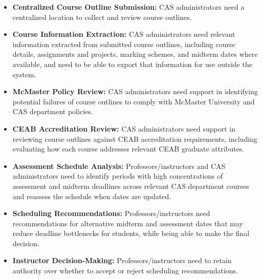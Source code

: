 \documentclass[12pt]{article}
\newcounter{srnum} %
\begin{document}

\noindent \begin{itemize}
  
\item[SR\refstepcounter{srnum}\thesrnum \label{SR-CAS-01}:] \textbf{Centralized Course Outline Submission:} 
CAS administrators need a centralized location to collect and review course outlines.

\item[SR\refstepcounter{srnum}\thesrnum \label{SR-CAS-02}:] \textbf{Course Information Extraction:} 
CAS administrators need relevant information extracted from submitted course outlines, including course 
details, assignments and projects, marking schemes, and midterm dates where available, and need to be able 
to export that information for use outside the system.

\item[SR\refstepcounter{srnum}\thesrnum \label{SR-CAS-03}:] \textbf{McMaster Policy Review:} 
CAS administrators need support in identifying potential failures of course outlines to comply 
with McMaster University and CAS department policies.

\item[SR\refstepcounter{srnum}\thesrnum \label{SR-CAS-04}:] \textbf{CEAB Accreditation Review:} 
CAS administrators need support in reviewing course outlines against CEAB accreditation 
requirements, including evaluating how each course addresses relevant CEAB graduate attributes.

\item[SR\refstepcounter{srnum}\thesrnum \label{SR-REC-01}:] \textbf{Assessment Schedule Analysis:} 
Professors/instructors and CAS administrators need to identify periods with high concentrations 
of assessment and midterm deadlines across relevant CAS department courses and reassess 
the schedule when dates are updated.

\item[SR\refstepcounter{srnum}\thesrnum \label{SR-REC-02}:] \textbf{Scheduling Recommendations:} 
Professors/instructors need recommendations for alternative midterm and assessment dates 
that may reduce deadline bottlenecks for students, while being able to make the final decision.

\item[SR\refstepcounter{srnum}\thesrnum \label{SR-REC-03}:] \textbf{Instructor Decision-Making:}
Professors/instructors need to retain authority over whether to accept or reject scheduling recommendations.


\end{itemize}
\end{document}
